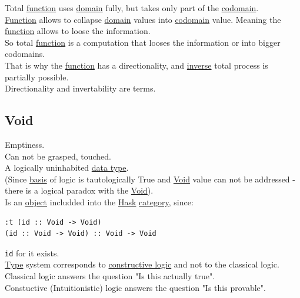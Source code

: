 \documentclass[11pt]{article}
\begin{document}
Total \hyperref[orgeb5cddb]{function} uses \hyperref[orgf784585]{domain} fully, but takes only part of the \hyperref[orgee70232]{codomain}.\\
\hyperref[orgeb5cddb]{Function} allows to collapse \hyperref[orgf784585]{domain} values into \hyperref[orgee70232]{codomain} value. Meaning the \hyperref[orgeb5cddb]{function} allows to loose the information.\\
So total \hyperref[orgeb5cddb]{function} is a computation that looses the information or into bigger codomains.\\
That is why the \hyperref[orgeb5cddb]{function} has a directionality, and \hyperref[org41275e7]{inverse} total process is partially possible.\\

Directionality and invertability are terms.\\

\subsection{\label{org94d6fd1}Void}
\label{sec:orgaa9f726}

Emptiness.\\

Can not be grasped, touched.\\

A logically uninhabited \hyperref[org965cde3]{data type}.\\

(Since \hyperref[org5650c52]{basis} of logic is tautologically True and \hyperref[org94d6fd1]{Void} value can not be addressed - there is a logical paradox with the \hyperref[org94d6fd1]{Void}).\\

Is an \hyperref[org025aac8]{object} includded into the \hyperref[org79be162]{Hask} \hyperref[org3e3a79b]{category}, since:\\
\begin{verbatim}
:t (id :: Void -> Void)
(id :: Void -> Void) :: Void -> Void
\end{verbatim}

\texttt{id} for it exists.\\

\hyperref[org4fbaeb8]{Type} system corresponds to \hyperref[org511fe33]{constructive logic} and not to the classical logic.\\
Classical logic answers the question "Is this actually true".\\
Constuctive (Intuitionistic) logic answers the question "Is this provable".\\
\end{document}
